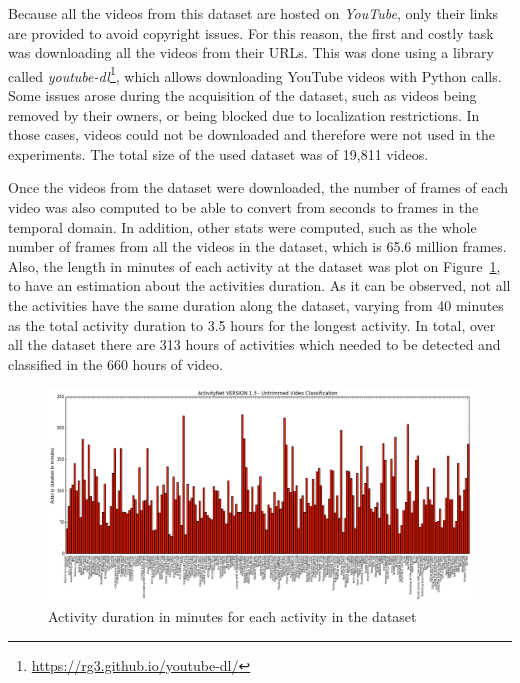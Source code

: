 Because all the videos from this dataset are hosted on \textit{YouTube}, only their links are provided to avoid copyright issues. For this reason, the first and costly task was downloading all the videos from their URLs. This was done using a library called \textit{youtube-dl}\footnote{\url{https://rg3.github.io/youtube-dl/}}, which allows downloading YouTube videos with Python calls. Some issues arose during the acquisition of the dataset, such as videos being removed by their owners, or being blocked due to localization restrictions. In those cases, videos could not be downloaded and therefore were not used in the experiments. The total size of the used dataset was of 19,811 videos.

Once the videos from the dataset were downloaded, the number of frames of each video was also computed to be able to convert from seconds to frames in the temporal domain.
In addition, other stats were computed, such as the whole number of frames from all the videos in the dataset, which is 65.6 million frames. Also, the length in minutes of each activity at the dataset was plot on Figure~\ref{fig:dataset_stats}, to have an estimation about the activities duration. As it can be observed, not all the activities have the same duration along the dataset, varying from 40 minutes as the total activity duration to 3.5 hours for the longest activity. In total, over all the dataset there are 313 hours of activities which needed to be detected and classified in the 660 hours of video.

\begin{figure}[ht]
\begin{center}
\includegraphics[width=1\linewidth]{img/methodology/dataset_stats}
\end{center}
\caption{Activity duration in minutes for each activity in the dataset}
\label{fig:dataset_stats}
\end{figure}

